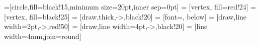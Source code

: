 =[circle,fill=black!15,minimum size=20pt,inner sep=0pt]
 = [vertex, fill=red!24]
 = [vertex, fill=black!25]
 = [draw,thick,->,black!20]
 = [font=\small, below]
 = [draw,line width=2pt,->,red!50]
 = [draw,line width=4pt,->,black!20]
 = [line width=4mm,join=round]
\usetikzlibrary{backgrounds}
